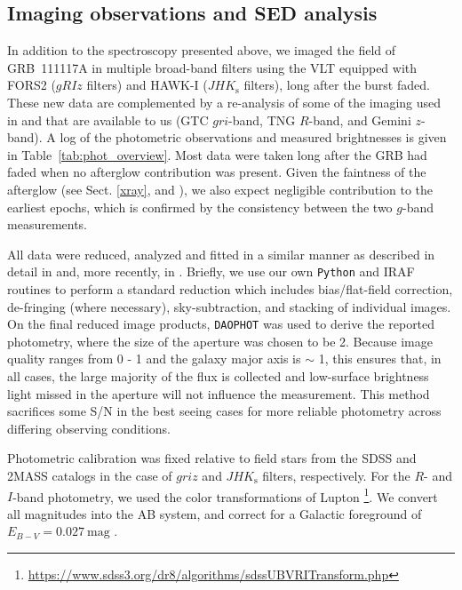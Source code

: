 \documentclass{aa}    %
\begin{document}
\subsection{Imaging observations and SED analysis} \label{SED}

In addition to the spectroscopy presented above, we imaged the field of
GRB~111117A in multiple broad-band filters using the VLT equipped with FORS2
($gRIz$ filters) and HAWK-I ($JHK_{\mathrm{s}}$ filters), long after the burst
faded. These new data are complemented by a re-analysis of some of the imaging
used in \citet{Margutti2012} and \citet{Sakamoto2013} that are available to us
(GTC $gri$-band, TNG $R$-band, and Gemini $z$-band). A log of the photometric
observations and measured brightnesses is given in
Table~\ref{tab:phot_overview}. Most data were taken long after the GRB had faded
when no afterglow contribution was present. Given the faintness of the afterglow
(see Sect. \ref{xray}, and \citealt{Cucchiara2011, Cenko2011}), we also expect
negligible contribution to the earliest epochs, which is confirmed by the
consistency between the two $g$-band measurements.

All data were reduced, analyzed and fitted in a similar manner as described in
detail in \citet{Kruhler2011a} and, more recently, in \citet{Schulze2016}.
Briefly, we use our own \texttt{Python} and IRAF routines to perform a standard
reduction which includes bias/flat-field correction, de-fringing (where
necessary), sky-subtraction, and stacking of individual images. On the final
reduced image products, \texttt{DAOPHOT} \citep{Stetson1987} was used to derive
the reported photometry, where the size of the aperture was chosen to be
2. Because image quality ranges from 0 - 1 and the galaxy
major axis is $\sim$ 1\farc, this ensures that, in all cases, the large majority
of the flux is collected and low-surface brightness light missed in the aperture
will not influence the measurement. This method sacrifices some S/N in the best
seeing cases for more reliable photometry across differing observing conditions.

Photometric calibration was fixed relative to field stars from the SDSS and
2MASS catalogs in the case of $griz$ and $JHK_{\mathrm{s}}$ filters,
respectively. For the $R$- and $I$-band photometry, we used the color
transformations of Lupton%
\footnote{\url{https://www.sdss3.org/dr8/algorithms/sdssUBVRITransform.php}}. We
convert all magnitudes into the AB system, and correct for a Galactic foreground
of $E_{B-V}=0.027~\mathrm{mag}$ \citep{Schlegel1998, Schlafly2011}.
\end{document}

